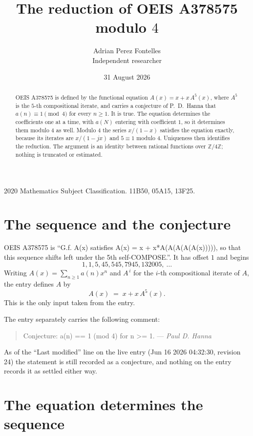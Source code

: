 \documentclass[11pt,a4paper]{article}
\title{The reduction of OEIS A378575 modulo $4$}
\author{Adrian Perez Fontelles\\ \small Independent researcher}
\date{31 August 2026}
\theoremstyle{plain}
\theoremstyle{definition}
\begin{document}
\maketitle

\begin{abstract}
OEIS A378575 is defined by the functional equation $A(x)=x+x\,A^{5}(x)$, where
$A^{5}$ is the $5$-th compositional iterate, and carries a conjecture of
P.~D.~Hanna that $a(n)\equiv1\pmod{4}$ for every $n\ge1$. It is true. The equation determines the coefficients one at a
time, with $a(N)$ entering with coefficient $1$, so it determines them modulo $4$ as
well. Modulo $4$ the series $x/(1-x)$ satisfies the equation exactly, because its
iterates are $x/(1-jx)$ and $5\equiv1$ modulo $4$. Uniqueness then identifies the
reduction. The argument is an identity between rational functions over
$\mathbb{Z}/4\mathbb{Z}$; nothing is truncated or estimated.
\end{abstract}

\noindent\small 2020 Mathematics Subject Classification. 11B50, 05A15, 13F25.\normalsize

\section{The sequence and the conjecture}

OEIS A378575 is ``G.f. A(x) satisfies A(x) = x + x*A(A(A(A(A(x))))), so that this sequence shifts left under the 5th self-COMPOSE.''. It has offset $1$ and begins
\[
1, 1, 5, 45, 545, 7945, 132005,\ \dots
\]
Writing $A(x)=\sum_{n\ge1}a(n)x^{n}$ and $A^{\,i}$ for the $i$-th compositional
iterate of $A$, the entry defines $A$ by
\begin{equation}\label{eq:fe}
A(x)\;=\;x+x\,A^{5}(x).
\end{equation}
This is the only input taken from the entry.

The entry separately carries the following comment:
\begin{quote}\small
Conjecture: a(n) == 1 (mod 4) for n >= 1. --- \emph{Paul D. Hanna}
\end{quote}
As of the ``Last modified'' line on the live entry (Jun 16 2026 04:32:30, revision 24) the statement is
still recorded as a conjecture, and nothing on the entry records it as settled either way.

\section{The equation determines the sequence}
\end{document}
